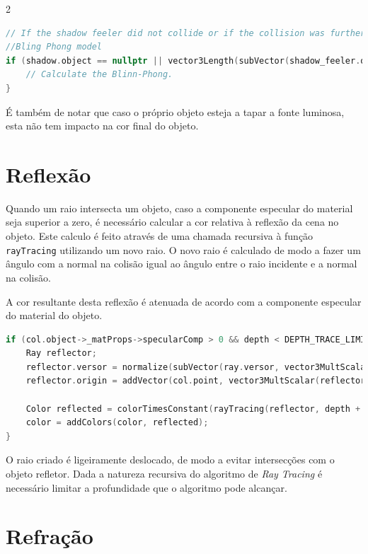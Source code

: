 \documentclass{article}
\begin{document}
\begin{multicols}{2}
\begin{lstlisting}[language=C++]
// If the shadow feeler did not collide or if the collision was further away than the light source.
//Bling Phong model
if (shadow.object == nullptr || vector3Length(subVector(shadow_feeler.origin, shadow.point)) > vector3Length(subVector(light->pos, col.point))) {
    // Calculate the Blinn-Phong.
}
\end{lstlisting}

    É também de notar que caso o próprio objeto esteja a tapar a fonte luminosa, esta não
    tem impacto na cor final do objeto.

    \section{Reflexão}
    
    Quando um raio intersecta um objeto, caso a componente especular do material
    seja superior a zero, é necessário calcular a cor relativa à reflexão da
    cena no objeto. Este calculo é feito através de uma chamada recursiva à função
    \verb|rayTracing| utilizando um novo raio. O novo raio é calculado de modo
    a fazer um ângulo com a normal na colisão igual ao ângulo entre o raio incidente
    e a normal na colisão.

    A cor resultante desta reflexão é atenuada de acordo com a componente especular
    do material do objeto.

\begin{lstlisting}[language=C++]
if (col.object->_matProps->specularComp > 0 && depth < DEPTH_TRACE_LIMIT) {
    Ray reflector;
    reflector.versor = normalize(subVector(ray.versor, vector3MultScalar(col.normal, 2 * internalProduct(ray.versor, col.normal))));
    reflector.origin = addVector(col.point, vector3MultScalar(reflector.versor, EPSILON));

    Color reflected = colorTimesConstant(rayTracing(reflector, depth + 1, RefrIndex), col.object->_matProps->specularComp);
    color = addColors(color, reflected);
}
\end{lstlisting}

    O raio criado é ligeiramente deslocado, de modo a evitar intersecções com o objeto refletor. Dada a natureza recursiva do algoritmo de \textit{Ray Tracing} é necessário
    limitar a profundidade que o algoritmo pode alcançar.

    \section{Refração}


\end{multicols}
\end{document}
